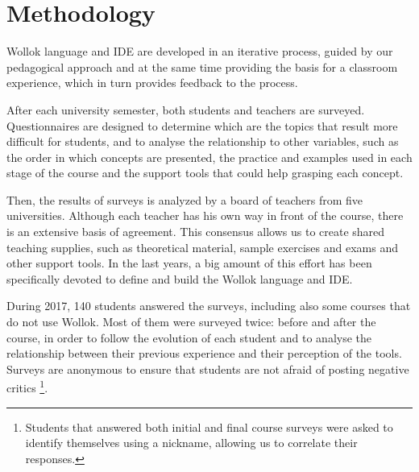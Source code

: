 \section{Methodology}
\label{sec:methodology}
Wollok language and IDE are developed in an iterative process, 
guided by our pedagogical approach 
and at the same time providing the basis for a classroom experience, 
which in turn provides feedback to the process.

After each university semester, both students and teachers are surveyed.
Questionnaires are designed to determine which are the topics that result more difficult for students, 
and to analyse the relationship to other variables,
such as the order in which concepts are presented,
the practice and examples used in each stage of the course
and the support tools that could help grasping each concept.

Then, the results of surveys is analyzed by a board of teachers from five universities.
Although each teacher has his own way in front of the course, there is an extensive basis of agreement.
This consensus allows us to create shared teaching supplies, such as theoretical material, sample exercises and exams and other support tools.
In the last years, a big amount of this effort has been specifically devoted to define and build the Wollok language and IDE.

\medskip

During 2017, 140 students answered the surveys, 
including also some courses that do not use Wollok.
Most of them were surveyed twice: 
before and after the course, 
in order to follow the evolution of each student
and to analyse the relationship between their previous experience 
and their perception of the tools.
Surveys are anonymous to ensure that students are not afraid of posting negative critics%
\footnote{Students that answered both initial and final course surveys were asked to identify themselves using a nickname, allowing us to correlate their responses.}.


